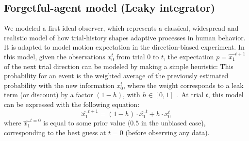 \documentclass[12pt,english]{article}%
\newcommand{\eql}[1]{\begin{equation}#1\end{equation}}
\newcommand{\citep}[1]{\parencite{#1}}
\begin{document}
\subsection{Forgetful-agent model (Leaky integrator)}%
We modeled a first ideal observer,
which represents a classical, widespread and
realistic model of how trial-history shapes
adaptive processes in human behavior.
It is adapted to model motion expectation in the direction-biased experiment.
In this model, given the observations $x_0^t$ from trial $0$ to $t$,
the expectation $p=\hat{x_1}^{t+1}$ of the next trial direction can be modeled by making a simple heuristic:
This probability for an event is the weighted average of
the previously estimated probability with the new information $x_0^t$,
where the weight corresponds to a leak term (or discount)
by a factor $(1 - h)$, with $h \in [0, 1]$~\citep{Anderson2006}.
At trial $t$, this model can be expressed with the following equation:
\eql{
\hat{x_1}^{t+1} = (1 - h) \cdot \hat{x_1}^{t} + h \cdot x_0^t
\label{eq:leaky}}
where $\hat{x_1}^{t=0}$ is equal to some prior value ($0.5$ in the unbiased case),
corresponding to the best guess at $t=0$ (before observing any data).
\end{document}
